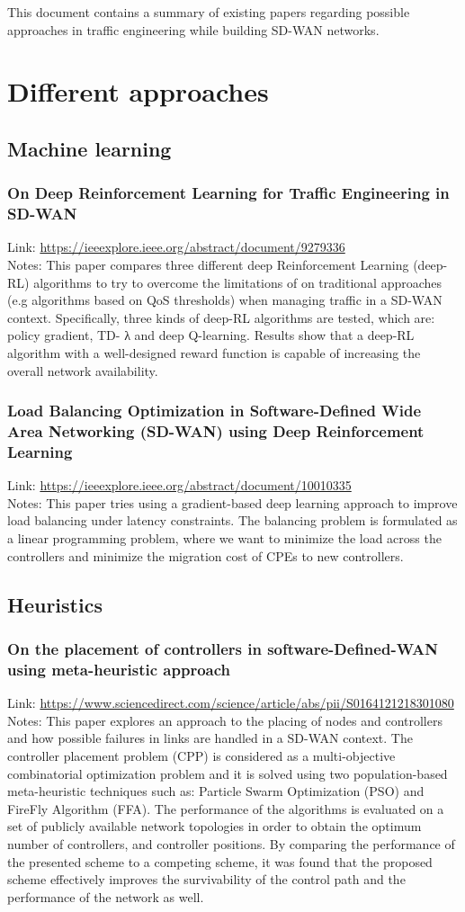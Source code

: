 \documentclass{article}
\newcommand{\paperEntry}[3]{
	\subsubsection{#2}
	Link: \href{#1}{#1}\\
	Notes: #3 \\
}
\begin{document}
	
	This document contains a summary of existing papers regarding possible approaches in traffic engineering while building SD-WAN networks.
	
	\section{Different approaches}
	\subsection{Machine learning}
	
	\paperEntry{https://ieeexplore.ieee.org/abstract/document/9279336}
			   {On Deep Reinforcement Learning for Traffic Engineering in SD-WAN}
			   {This paper compares three different deep Reinforcement Learning (deep-RL) algorithms to try to overcome the limitations of on traditional approaches (e.g algorithms based on QoS thresholds) when managing traffic in a SD-WAN context. Specifically, three kinds of deep-RL algorithms are tested, which are: policy gradient, TD- λ and deep Q-learning. Results show that a deep-RL algorithm with a well-designed reward function is capable of increasing the overall network availability.}
			   
	\paperEntry{https://ieeexplore.ieee.org/abstract/document/10010335}
	{Load Balancing Optimization in Software-Defined Wide Area Networking (SD-WAN) using Deep Reinforcement Learning}
	{This paper tries using a gradient-based deep learning approach to improve load balancing under latency constraints. The balancing problem is formulated as a linear programming problem, where we want to minimize the load across the controllers and minimize the migration cost of CPEs to new controllers.}		   
	
	\subsection{Heuristics}
		  
	\paperEntry{https://www.sciencedirect.com/science/article/abs/pii/S0164121218301080}
		{On the placement of controllers in software-Defined-WAN using meta-heuristic approach}
		{This paper explores an approach to the placing of nodes and controllers and how possible failures in links are handled in a SD-WAN context. The controller placement problem (CPP) is considered as a multi-objective combinatorial optimization problem and  it is solved using two population-based meta-heuristic techniques such as: Particle Swarm Optimization (PSO) and FireFly Algorithm (FFA). The performance of the algorithms is evaluated on a set of publicly available network topologies in order to obtain the optimum number of controllers, and controller positions. By comparing the performance of the presented scheme to a competing scheme, it was found that the proposed scheme effectively improves the survivability of the control path and the performance of the network as well.}
	
\end{document}
